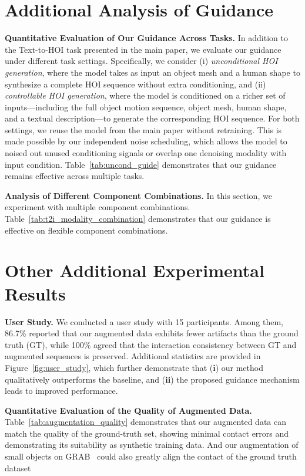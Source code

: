 \section{Additional Analysis of Guidance}\label{sec:exp_supp_guidance}
\noindent\textbf{Quantitative Evaluation of Our Guidance Across Tasks.}
In addition to the Text-to-HOI task presented in the main paper, we evaluate our guidance under different task settings. Specifically, we consider (i) \emph{unconditional HOI generation}, where the model takes as input an object mesh and a human shape to synthesize a complete HOI sequence without extra conditioning, and (ii) \emph{controllable HOI generation}, where the model is conditioned on a richer set of inputs—including the full object motion sequence, object mesh, human shape, and a textual description—to generate the corresponding HOI sequence. For both settings, we reuse the model from the main paper without retraining. This is made possible by our independent noise scheduling, which allows the model to noised out unused conditioning signals or overlap one denoising modality with input condition. Table~\ref{tab:uncond_guide} demonstrates that our guidance remains effective across multiple tasks.


\noindent\textbf{Analysis of Different Component Combinations.} In this section, we experiment with multiple component combinations. Table~\ref{tab:t2i_modality_combination} demonstrates that our guidance is effective on flexible component combinations.



\section{Other Additional Experimental Results}\label{sec:add_exp_supp}
\noindent\textbf{User Study.}
We conducted a user study with 15 participants. Among them, 86.7\% reported that our augmented data exhibits fewer artifacts than the ground truth (GT), while 100\% agreed that the interaction consistency between GT and augmented sequences is preserved. Additional statistics are provided in Figure~\ref{fig:user_study}, which further demonstrate that (\textbf{i}) our method qualitatively outperforms the baseline, and (\textbf{ii}) the proposed guidance mechanism leads to improved performance.

\noindent\textbf{Quantitative Evaluation of the Quality of Augmented Data.} Table~\ref{tab:augmentation_quality} demonstrates that our augmented data can match the quality of the ground-truth set, showing minimal contact errors and demonstrating its suitability as synthetic training data. And our  augmentation of small objects on GRAB~\citep{taheri2020grab} could also greatly align the contact of the ground truth dataset




